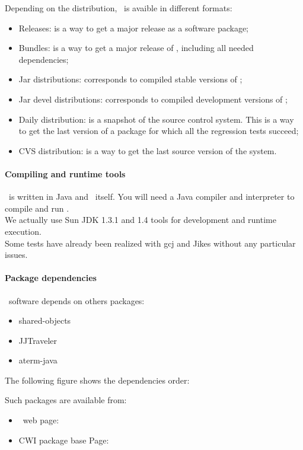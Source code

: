 Depending on the distribution, \TOM\ is avaible in different formats:
\begin{itemize}
\item Releases: is a way to get a major release as a software package;
\item Bundles: is  a way to get a major release of \TOM, including all
  needed dependencies;
\item Jar distributions: corresponds to compiled stable versions of \TOM;
\item Jar devel distributions: corresponds to compiled development versions of \TOM;
\item Daily distribution: is a snapshot of the source control
  system. This is a way to get the last version of a package for which
  all the regression tests succeed;

\item CVS distribution: is a way to get the last source version of the
  system.
\end{itemize}

\paragraph{Compiling and runtime tools}
\TOM\ is written in Java and \TOM\ itself. You will need a Java
compiler and interpreter to compile and run \TOM. 
\\We actually use Sun JDK 1.3.1 and 1.4 tools for development and runtime
execution.
\\Some tests have already been realized with gcj
and Jikes without any particular issues.

\paragraph{Package dependencies}
\TOM\ software depends on others packages:
\begin{itemize}
\item shared-objects
\item JJTraveler
\item aterm-java
\end{itemize}
The following figure shows the dependencies order:


Such packages are available from:
\begin{itemize}
\item \TOM\ web page:~
\item CWI package base Page:~
\end{itemize}    

